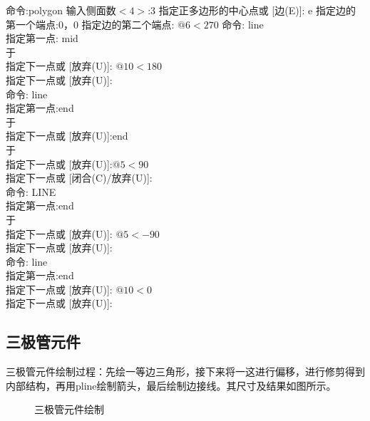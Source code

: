 \noindent
命令:polygon 输入侧面数$ <4>$:3
指定正多边形的中心点或 [边(E)]: e
指定边的第一个端点:0，0
指定边的第二个端点: $@6<270$
命令: line \\
指定第一点: mid\\
于\\
指定下一点或 [放弃(U)]: $@10<180$\\
指定下一点或 [放弃(U)]:\\
命令: line \\
指定第一点:end\\
于\\
指定下一点或 [放弃(U)]:end\\
于\\
指定下一点或 [放弃(U)]:$ @5<90$\\
指定下一点或 [闭合(C)/放弃(U)]:\\
命令:  LINE \\
指定第一点:end\\
于\\
指定下一点或 [放弃(U)]: $@5<-90$\\
指定下一点或 [放弃(U)]:\\
命令: line\\
指定第一点:end\\
指定下一点或 [放弃(U)]: $@10<0$\\
指定下一点或 [放弃(U)]:\\

\subsection{三极管元件}
三极管元件绘制过程：先绘一等边三角形，接下来将一这进行偏移，进行修剪得到内部结构，再用pline绘制箭头，最后绘制边接线。其尺寸及结果如图所示。

\noindent
\begin{figure}[htbp]
\centering
{}\hspace{30pt}
\hspace{30pt}
\caption{三极管元件绘制}
\end{figure}

